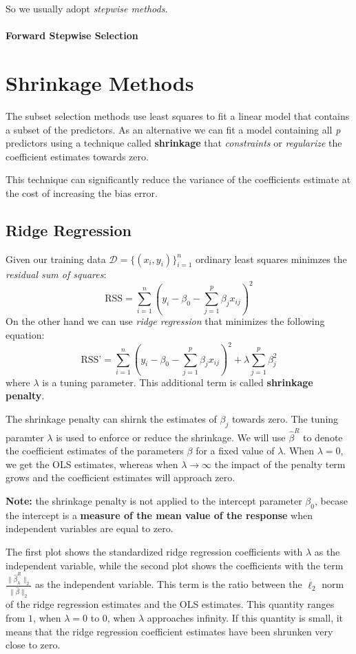 So we usually adopt \textit{stepwise methods}.

\paragraph*{Forward Stepwise Selection}

\section{Shrinkage Methods}
The subset selection methods use least squares to fit a linear model that contains a subset of the predictors. As an alternative we can fit a model containing all \textit{p} predictors using a technique called \textbf{shrinkage} that \textit{constraints} or \textit{regularize} the coefficient estimates towards zero.

This technique can significantly reduce the variance of the coefficients estimate at the cost of increasing the bias error.

\subsection*{Ridge Regression}
Given our training data $\mathcal{D} = \{(x_i, y_i)\}_{i=1}^n $ ordinary least squares minimzes the \textit{residual sum of squares}:
\[
    \text{RSS} = \sum_{i=1}^{n} \left(y_i - \beta_0 - \sum_{j=1}^{p} \beta_j x_{ij}\right)^2
\]
On the other hand we can use \textit{ridge regression} that minimizes the following equation:
\[
    \text{RSS'} = \sum_{i=1}^{n} \left(y_i - \beta_0 - \sum_{j=1}^{p} \beta_j x_{ij}\right)^2 + \lambda \sum_{j=1}^{p} \beta_j^2
\]
where $\lambda$ is a tuning parameter. This additional term is called \textbf{shrinkage penalty}.

The shrinkage penalty can shirnk the estimates of $\beta_j$ towards zero. The tuning paramter $\lambda$ is used to enforce or reduce the shrinkage. We will use $\hat{\beta}^R$ to denote the coefficient estimates of the parameters $\beta$ for a fixed value of $\lambda$. When $\lambda = 0$, we get the OLS estimates, whereas when $\lambda \to \infty$ the impact of the penalty term grows and the coefficient estimates will approach zero.

\textbf{Note:} the shrinkage penalty is not applied to the intercept parameter $\beta_0$, becase the intercept is a \textbf{measure of the mean value of the response} when independent variables are equal to zero.

The first plot shows the standardized ridge regression coefficients with $\lambda$ as the independent variable, while the second plot shows the coefficients with the term $\frac{\lVert \hat{\beta}_\lambda^R \rVert_2}{ \lVert \hat{\beta} \rVert_2}$ as the independent variable. This term is the ratio between the $\ell_2$ norm of the ridge regression estimates and the OLS estimates. This quantity ranges from $1$, when $\lambda = 0$ to $0$, when $\lambda$ approaches infinity. If this quantity is small, it means that the ridge regression coefficient estimates have been shrunken very close to zero.

